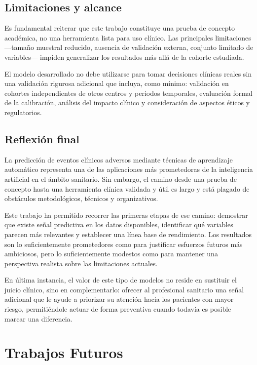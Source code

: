 \documentclass[12pt, a4paper, oneside]{report}
\begin{document}
\section{Limitaciones y alcance}

Es fundamental reiterar que este trabajo constituye una prueba de concepto académica, no una herramienta lista para uso clínico. Las principales limitaciones —tamaño muestral reducido, ausencia de validación externa, conjunto limitado de variables— impiden generalizar los resultados más allá de la cohorte estudiada.

El modelo desarrollado no debe utilizarse para tomar decisiones clínicas reales sin una validación rigurosa adicional que incluya, como mínimo: validación en cohortes independientes de otros centros y periodos temporales, evaluación formal de la calibración, análisis del impacto clínico y consideración de aspectos éticos y regulatorios.

\section{Reflexión final}

La predicción de eventos clínicos adversos mediante técnicas de aprendizaje automático representa una de las aplicaciones más prometedoras de la inteligencia artificial en el ámbito sanitario. Sin embargo, el camino desde una prueba de concepto hasta una herramienta clínica validada y útil es largo y está plagado de obstáculos metodológicos, técnicos y organizativos.

Este trabajo ha permitido recorrer las primeras etapas de ese camino: demostrar que existe señal predictiva en los datos disponibles, identificar qué variables parecen más relevantes y establecer una línea base de rendimiento. Los resultados son lo suficientemente prometedores como para justificar esfuerzos futuros más ambiciosos, pero lo suficientemente modestos como para mantener una perspectiva realista sobre las limitaciones actuales.

En última instancia, el valor de este tipo de modelos no reside en sustituir el juicio clínico, sino en complementarlo: ofrecer al profesional sanitario una señal adicional que le ayude a priorizar su atención hacia los pacientes con mayor riesgo, permitiéndole actuar de forma preventiva cuando todavía es posible marcar una diferencia.

\chapter{Trabajos Futuros}
\label{chap:trabajos_futuros}
\end{document}
